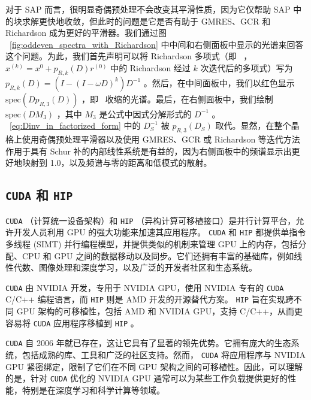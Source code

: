 \documentclass[5p,times,a4paper,fleqn]{cas-dc}
\begin{document}
对于 SAP 而言，很明显奇偶预处理不会改变其平滑性质，因为它仅帮助 SAP 中的块求解更快地收敛，但此时的问题是它是否有助于 GMRES、GCR 和 Richardson 成为更好的平滑器。我们通过图 \     \ref{fig:oddeven_spectra_with_Richardson}    中中间和右侧面板中显示的光谱来回答这个问题。为此，我们首先声明可以将 Richardson 多项式（即 \  ，   $x^{(k)} = x^{0} + p_{R,k}(D) r^{(0)}$    中的 Richardson 经过    $k$    次迭代后的多项式）写为    $p_{R,k}(D) = ( I-(I-\omega D)^{k} )D^{-1}$    。然后，在中间面板中，我们以红色显示    $\mathrm{spec}\left(Dp_{R,3}(D)\right)$    ，即 \  收缩的光谱。最后，在右侧面板中，我们绘制    $\mathrm{spec}\left(DM_{3}\right)$    ，其中    $M_{3}$    是公式中因式分解形式的    $D^{-1}$    。 \     \ref{eq:Dinv_in_factorized_form}    中的    $D_{S}^{-1}$    被    $p_{R,3}(D_{S})$    取代。显然，在整个晶格上使用奇偶预处理平滑器以及使用 GMRES、GCR 或 Richardson 等迭代方法作用于具有 Schur 补的内部线性系统是有益的，因为右侧面板中的频谱显示出更好地映射到 1.0，以及频谱与零的距离和低模式的散射。  

   \subsection{   \texttt{CUDA}    和    \texttt{HIP}     }     

   \texttt{CUDA}       \cite{NVIDIACU33:online}   （计算统一设备架构）和    \texttt{HIP}       \cite{HIPdocum88:online,HIP_GitHub}   （异构计算可移植接口）是并行计算平台，允许开发人员利用 GPU 的强大功能来加速其应用程序。   \texttt{CUDA}    和    \texttt{HIP}    都提供单指令多线程 (SIMT) 并行编程模型，并提供类似的机制来管理 GPU 上的内存，包括分配、CPU 和 GPU 之间的数据移动以及同步。它们还拥有丰富的基础库，例如线性代数、图像处理和深度学习，以及广泛的开发者社区和生态系统。  

   \texttt{CUDA}    由 NVIDIA 开发，专用于 NVIDIA GPU，使用 NVIDIA 专有的    \texttt{CUDA}    C/C++ 编程语言，而    \texttt{HIP}    则是 AMD 开发的开源替代方案。   \texttt{HIP}    旨在实现跨不同 GPU 架构的可移植性，包括 AMD 和 NVIDIA GPU，支持 C/C++，从而更容易将    \texttt{CUDA}    应用程序移植到    \texttt{HIP}   。  

   \texttt{CUDA}    自 2006 年就已存在，这让它具有了显著的领先优势。它拥有庞大的生态系统，包括成熟的库、工具和广泛的社区支持。然而，   \texttt{CUDA}    将应用程序与 NVIDIA GPU 紧密绑定，限制了它们在不同 GPU 架构之间的可移植性。因此，可以理解的是，针对    \texttt{CUDA}    优化的 NVIDIA GPU 通常可以为某些工作负载提供更好的性能，特别是在深度学习和科学计算等领域。  
\end{document}
